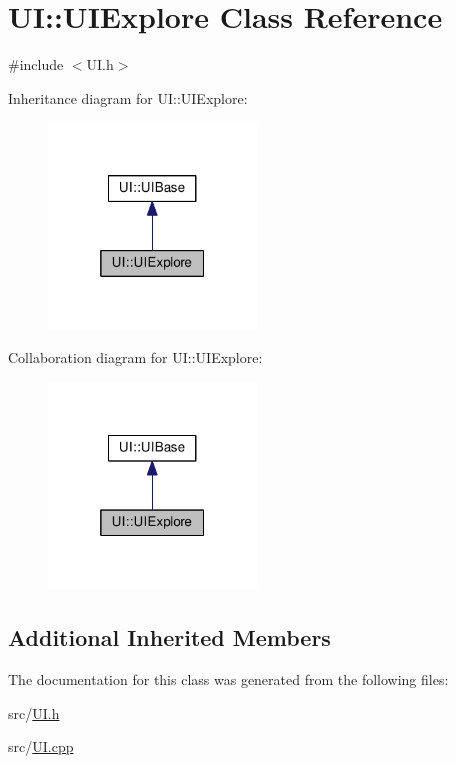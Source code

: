 \hypertarget{class_u_i_1_1_u_i_explore}{}\section{UI\+:\+:U\+I\+Explore Class Reference}
\label{class_u_i_1_1_u_i_explore}


{\ttfamily \#include $<$U\+I.\+h$>$}



Inheritance diagram for UI\+:\+:U\+I\+Explore\+:\nopagebreak
\begin{figure}[H]
\begin{center}
\leavevmode
\includegraphics[width=157pt]{class_u_i_1_1_u_i_explore__inherit__graph}
\end{center}
\end{figure}


Collaboration diagram for UI\+:\+:U\+I\+Explore\+:\nopagebreak
\begin{figure}[H]
\begin{center}
\leavevmode
\includegraphics[width=157pt]{class_u_i_1_1_u_i_explore__coll__graph}
\end{center}
\end{figure}
\subsection*{Additional Inherited Members}


The documentation for this class was generated from the following files\+:\begin{DoxyCompactItemize}
\item 
src/\hyperlink{_u_i_8h}{U\+I.\+h}\item 
src/\hyperlink{_u_i_8cpp}{U\+I.\+cpp}\end{DoxyCompactItemize}
